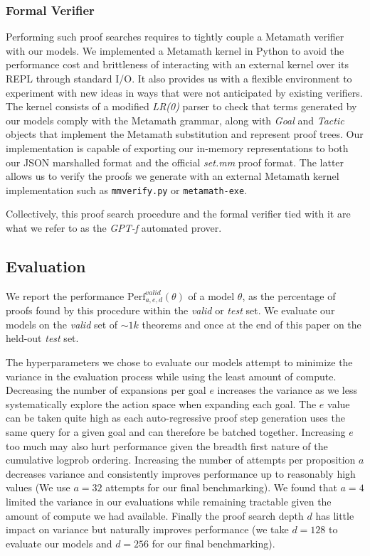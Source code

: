\documentclass{article}
\begin{document}
\subsubsection{Formal Verifier}
Performing such proof searches requires to tightly couple a Metamath verifier with our models. We implemented a Metamath kernel in Python to avoid the performance cost and brittleness of interacting with an external kernel over its REPL through standard I/O. It also provides us with a flexible environment to experiment with new ideas in ways that were not anticipated by existing verifiers. The kernel consists of a modified \textit{LR(0)} parser to check that terms generated by our models comply with the Metamath grammar, along with \textit{Goal} and \textit{Tactic} objects that implement the Metamath substitution and represent proof trees. Our implementation is capable of exporting our in-memory representations to both our JSON marshalled format and the official \textit{set.mm} proof format. The latter allows us to verify the proofs we generate with an external Metamath kernel implementation such as \verb|mmverify.py| or \verb|metamath-exe|.

Collectively, this proof search procedure and the formal verifier tied with it are what we refer to as the \textit{GPT-f} automated prover.

\subsection{Evaluation}

We report the performance $\text{Perf}_{a,e,d}^{\mathit{valid}}(\theta)$ of a model $\theta$, as the percentage of proofs found by this procedure within the \textit{valid} or \textit{test} set. We evaluate our models on the \textit{valid} set of $\sim 1k$ theorems and once at the end of this paper on the held-out \textit{test} set.

The hyperparameters we chose to evaluate our models attempt to minimize the variance in the evaluation process while using the least amount of compute. Decreasing the number of expansions per goal $e$ increases the
variance as we less systematically explore the action space when expanding each goal. The $e$ value can be taken quite high as each auto-regressive proof step generation uses the same query for a given goal and can therefore be batched together. Increasing $e$ too much may also hurt performance given the breadth first nature of the cumulative logprob ordering. Increasing the number of attempts per proposition $a$ decreases variance and consistently improves performance up to reasonably high values (We use $a=32$ attempts for our final benchmarking). We found that $a=4$ limited the variance in our evaluations while remaining tractable given the amount of compute we had available. Finally the proof search depth $d$ has little impact on variance but naturally improves performance (we take $d=128$ to evaluate our models and $d=256$ for our final benchmarking).
\end{document}
